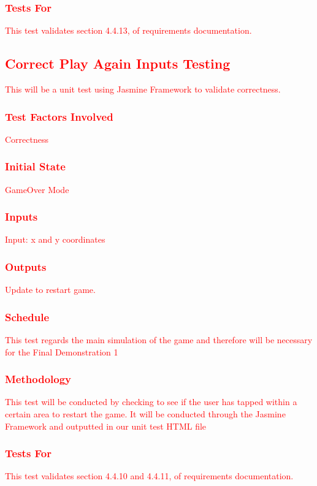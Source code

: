 \documentclass[11pt, oneside]{article}   	%
\begin{document}
\subsubsection{\textcolor{red}{Tests For}}
\textcolor{red}{This test validates section 4.4.13, of requirements documentation.}


\subsection{\textcolor{red}{Correct Play Again Inputs Testing}}
\textcolor{red}{This will be a unit test using Jasmine Framework to validate correctness.}
\subsubsection{\textcolor{red}{Test Factors Involved}}
\textcolor{red}{Correctness}
\subsubsection{\textcolor{red}{Initial State}}
\textcolor{red}{GameOver Mode}
\subsubsection{\textcolor{red}{Inputs}}
\textcolor{red}{Input: x and y coordinates}
\subsubsection{\textcolor{red}{Outputs}}
\textcolor{red}{Update to restart game.}
\subsubsection{\textcolor{red}{Schedule}}
\textcolor{red}{This test regards the main simulation of the game and therefore will be necessary for the Final Demonstration 1}
\subsubsection{\textcolor{red}{Methodology}}
\textcolor{red}{This test will be conducted by checking to see if the user has tapped within a certain area to restart the game. It will be conducted through the Jasmine Framework and outputted in our unit test HTML file}
\subsubsection{\textcolor{red}{Tests For}}
\textcolor{red}{This test validates section 4.4.10 and 4.4.11, of requirements documentation.}
\end{document}
